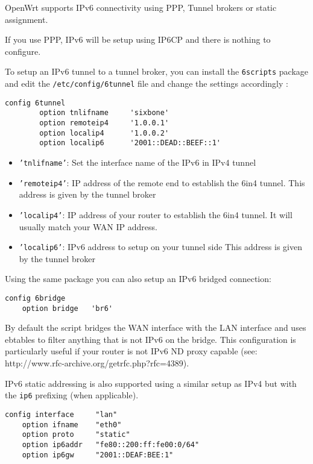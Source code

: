 OpenWrt supports IPv6 connectivity using PPP, Tunnel brokers or static
assignment.

If you use PPP, IPv6 will be setup using IP6CP and there is nothing to
configure.

To setup an IPv6 tunnel to a tunnel broker, you can install the
\texttt{6scripts} package and edit the \texttt{/etc/config/6tunnel}
file and change the settings accordingly :

\begin{Verbatim}
config 6tunnel
        option tnlifname     'sixbone'
        option remoteip4     '1.0.0.1'
        option localip4      '1.0.0.2'
        option localip6      '2001::DEAD::BEEF::1'
\end{Verbatim}

\begin{itemize}
    \item{\texttt{'tnlifname'}:}
        Set the interface name of the IPv6 in IPv4 tunnel
    \item{\texttt{'remoteip4'}:}
        IP address of the remote end to establish the 6in4 tunnel.
	This address is given by the tunnel broker
    \item{\texttt{'localip4'}:}
	IP address of your router to establish the 6in4 tunnel.
	It will usually match your WAN IP address.
    \item{\texttt{'localip6'}:}
	IPv6 address to setup on your tunnel side
	This address is given by the tunnel broker
\end{itemize}

Using the same package you can also setup an IPv6 bridged connection:

\begin{Verbatim}
config 6bridge
	option bridge	'br6'
\end{Verbatim}

By default the script bridges the WAN interface with the LAN interface
and uses ebtables to filter anything that is not IPv6 on the bridge.
This configuration is particularly useful if your router is not
IPv6 ND proxy capable (see: http://www.rfc-archive.org/getrfc.php?rfc=4389).

IPv6 static addressing is also supported using a similar setup as
IPv4 but with the \texttt{ip6} prefixing (when applicable).

\begin{Verbatim}
config interface     "lan"
    option ifname    "eth0"
    option proto     "static"
    option ip6addr   "fe80::200:ff:fe00:0/64"
    option ip6gw     "2001::DEAF:BEE:1"
\end{Verbatim}
